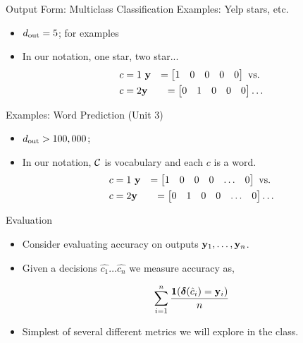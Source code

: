 \documentclass{beamer}
\begin{document}
\begin{frame}{Output Form: Multiclass Classification}
  Examples: Yelp stars, etc.
  \begin{itemize}
  \item ${d_{\mathrm{out}}} = 5$; for examples
  \item In our notation, one star, two star...
    \begin{eqnarray*} 
    c = 1 & \  \mathbf{y} &= \begin{bmatrix} 1 & 0 & 0 & 0 & 0  \end{bmatrix}  \mathrm {\ vs. \ } \\
    c = 2 & \mathbf{y} &=    \begin{bmatrix} 0 & 1 & 0 & 0 & 0 \end{bmatrix} \ldots
   \end{eqnarray*} 
  \end{itemize}
  Examples: Word Prediction (Unit 3)
  \begin{itemize}
  \item ${d_{\mathrm{out}}} > 100,000$; 
  \item In our notation, $\mathcal{C}$ is vocabulary and each $c$ is a word.   
    \begin{eqnarray*} 
    c = 1 & \  \mathbf{y} &= \begin{bmatrix} 1 & 0 & 0 & 0 & \ldots & 0  \end{bmatrix}  \mathrm {\ vs. \ } \\
    c = 2 & \mathbf{y} &=    \begin{bmatrix} 0 & 1 & 0 & 0 & \ldots & 0 \end{bmatrix} \ldots
   \end{eqnarray*} 
  \end{itemize}
\end{frame}

\begin{frame}{Evaluation}
  \begin{itemize}
  \item Consider evaluating accuracy on outputs $\mathbf{y}_1, \ldots, \mathbf{y}_n$. 

  \item Given a decisions $\hat{c_1} \ldots \hat{c_n}$ we measure 
  accuracy as,
  
  \[ \sum_{i=1}^n \frac{\mathbf{1}(\boldsymbol{\delta}(\hat{c}_i) = \mathbf{y}_i)}{ n} \] 

  \item Simplest of  several different metrics we will explore in the class. 
  \end{itemize}
\end{frame}
\end{document}
